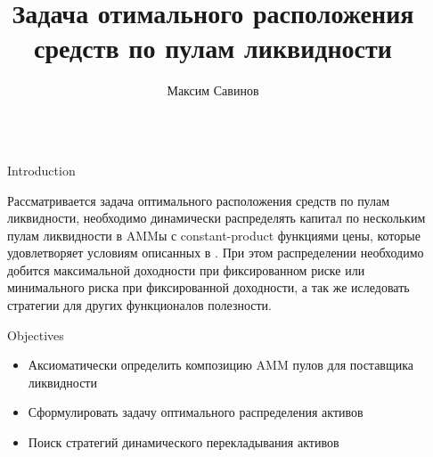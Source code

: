 \documentclass[]{beamer}
\title{Задача отимального расположения средств по пулам ликвидности}
\author{Максим Савинов}
\begin{document}
\nocite{*} %

\begin{frame}[t]
    \begin{columns}[t] %
     
    \begin{column}{\sepwid}\end{column} %
    
    \begin{column}{\onecolwid} %
     
    
    \begin{block}{Introduction}
    
        Рассматривается задача оптимального расположения средств по пулам ликвидности, необходимо динамически распределять капитал по нескольким пулам ликвидности в AMMы с constant-product функциями цены, которые удовлетворяет условиям описанных в \cite{Engel2021}.
        При этом распределении необходимо добится максимальной доходности при фиксированном риске или минимального риска при фиксированной доходности, а так же иследовать стратегии для других функционалов полезности. 
    
    \end{block}
    
    
    \begin{alertblock}{Objectives}
    
    \begin{itemize}
    \item Аксиоматически определить композицию AMM пулов для поставщика ликвидности
    \item Сформулировать задачу оптимального распределения активов
    \item Поиск стратегий динамического перекладывания активов
    \end{itemize}
    

\end{alertblock}
\end{column}
\end{columns}
\end{frame}
\end{document}
